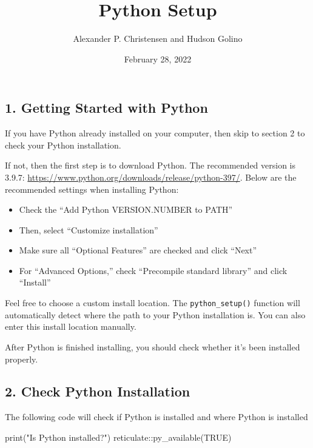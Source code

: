 \documentclass[
]{article}
\title{Python Setup}
\author{Alexander P. Christensen and Hudson Golino}
\date{February 28, 2022}
\newenvironment{Shaded}{\begin{snugshade}}{\end{snugshade}}
\newcommand{\ConstantTok}[1]{\textcolor[rgb]{0.00,0.00,0.00}{#1}}
\newcommand{\FunctionTok}[1]{\textcolor[rgb]{0.00,0.00,0.00}{#1}}
\newcommand{\NormalTok}[1]{#1}
\newcommand{\SpecialCharTok}[1]{\textcolor[rgb]{0.00,0.00,0.00}{#1}}
\newcommand{\StringTok}[1]{\textcolor[rgb]{0.31,0.60,0.02}{#1}}
\begin{document}
\maketitle

\hypertarget{section_1}{%
\subsection{1. Getting Started with Python}\label{section_1}}

If you have Python already installed on your computer, then skip to
section 2 to check your Python installation.

If not, then the first step is to download Python. The recommended
version is 3.9.7:
\url{https://www.python.org/downloads/release/python-397/}. Below are
the recommended settings when installing Python:

\begin{itemize}
\item
  Check the ``Add Python VERSION.NUMBER to PATH''
\item
  Then, select ``Customize installation''
\item
  Make sure all ``Optional Features'' are checked and click ``Next''
\item
  For ``Advanced Options,'' check ``Precompile standard library'' and
  click ``Install''
\end{itemize}

Feel free to choose a custom install location. The
\texttt{python\_setup()} function will automatically detect where the
path to your Python installation is. You can also enter this install
location manually.

After Python is finished installing, you should check whether it's been
installed properly.

\hypertarget{check-python-installation}{%
\subsection{2. Check Python
Installation}\label{check-python-installation}}

The following code will check if Python is installed and where Python is
installed

\begin{Shaded}
\begin{Highlighting}[]
\FunctionTok{print}\NormalTok{(}\StringTok{"Is Python installed?"}\NormalTok{)}
\NormalTok{reticulate}\SpecialCharTok{::}\FunctionTok{py\_available}\NormalTok{(}\ConstantTok{TRUE}\NormalTok{)}
\end{Highlighting}
\end{Shaded}
\end{document}
